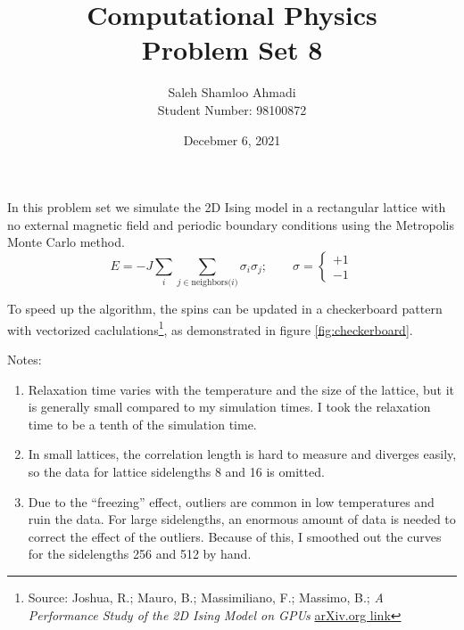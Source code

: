 \documentclass[12pt,a4paper]{article}
\title{Computational Physics\\Problem Set 8}
\author{Saleh Shamloo Ahmadi\\Student Number: 98100872}
\date{Decebmer 6, 2021}
\begin{document}
	\maketitle
	In this problem set we simulate the 2D Ising model in a rectangular lattice with no external magnetic field
	and periodic boundary conditions using the Metropolis Monte Carlo method.
	\begin{equation}
		E = -J\sum_i\sum_{j\in\text{neighbors($i$)}}\sigma_i\sigma_j;\qquad
		\sigma=\left\{\begin{gathered}
			+1\\-1
		\end{gathered}\right.
	\end{equation}

	To speed up the algorithm, the spins can be updated in a checkerboard pattern with vectorized
	caclulations\footnote{Source: Joshua, R.; Mauro, B.; Massimiliano, F.; Massimo, B.;
	\textit{A Performance Study of the 2D Ising Model on GPUs} \href{https://arxiv.org/abs/1906.06297}{arXiv.org link}},
	as demonstrated in figure \ref{fig:checkerboard}.

	Notes:
	\begin{enumerate}
		\item Relaxation time varies with the temperature and the size of the lattice, but it is generally small
		compared to my simulation times. I took the relaxation time to be a tenth of the simulation time. 
		\item In small lattices, the correlation length is hard to measure and diverges easily, so the data for lattice
		sidelengths 8 and 16 is omitted.
		\item Due to the \enquote{freezing} effect, outliers are common in low temperatures and ruin the data. For large
		sidelengths, an enormous amount of data is needed to correct the effect of the outliers. Because of this,
		I smoothed out the curves for the sidelengths 256 and 512 by hand.
	\end{enumerate}
\end{document}
